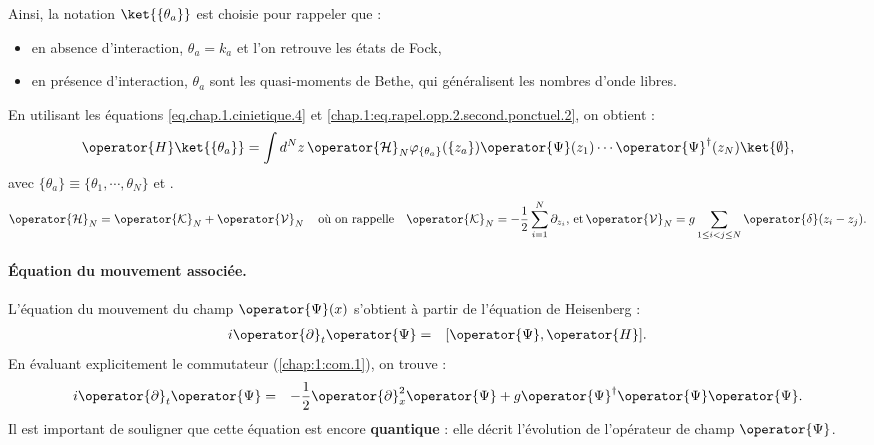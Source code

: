 Ainsi, la notation $\ket{\{\theta_a \}}$  est choisie pour rappeler que :
\begin{itemize}[label = $\bullet$]
	\item en absence d’interaction, $\theta_a = k_a$ et l’on retrouve les états de Fock,
	\item en présence d’interaction, $\theta_a$ sont les quasi-moments de Bethe, qui généralisent les nombres d’onde libres.
\end{itemize}

\medskip

En utilisant les équations \eqref{eq.chap.1.cinietique.4} et \eqref{chap.1:eq.rapel.opp.2.second.ponctuel.2}, on obtient : 
\begin{eqnarray}\label{chap.1:eq.LL.champ.2}
	\operator{H}\ket{\{\theta_a\}} =  \int d^Nz \, \operator{\mathcal{H}}_N \varphi_{\{\theta_a\}}(\{z_a\})\operator{\Psi}(z_1)\cdots \operator{\Psi}^\dag(z_N) \ket{\emptyset}, 
\end{eqnarray}
avec $\{\theta_a\} \equiv \{ \theta_1 , \cdots , \theta_N \} $ et .
\begin{eqnarray}\label{chap.1:eq.LL.eta.1}
\operator{\mathcal{H}}_N  =  \operator{\mathcal{K}}_N  +  \operator{\mathcal{V}}_N \, \quad \mbox{où on rappelle} \quad \operator{\mathcal{K}}_N = -\frac{1}2\sum_{i=1}^N \partial_{z_i} , \,  \mbox{et} \, 	\operator{\mathcal{V}}_N = g\sum_{1\leq i < j \leq N } \operator{\delta}(z_i - z_j)	. 
\end{eqnarray}





\paragraph{Équation du mouvement associée.}

L’équation du mouvement du champ \( \operator{\Psi}(x) \) s'obtient à partir de l’équation de Heisenberg :
\begin{eqnarray}\label{chap.1:eq.GP.1}
	i\operator{\partial}_t	\operator{\Psi} & = & [ \operator{\Psi} , \operator{H} ].
\end{eqnarray}
En évaluant explicitement le commutateur (\ref{chap:1:com.1}), on trouve :
\begin{eqnarray}
	i \operator{\partial}_t \operator{\Psi}	 & = & - \frac{1}{2}\operator{\partial}_x^2 \operator{\Psi} + g \operator{\Psi}^\dag\operator{\Psi} \operator{\Psi}.
\end{eqnarray}
Il est important de souligner que cette équation est encore {\bf quantique} : elle décrit l’évolution de l’opérateur de champ $\operator{\Psi}$.

